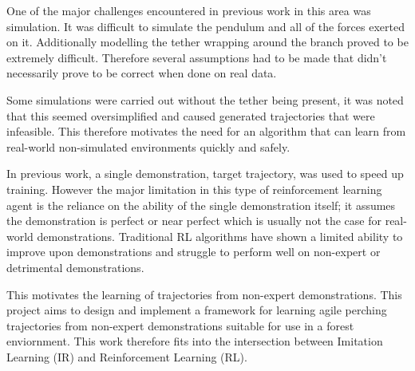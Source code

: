 One of the major challenges encountered in previous work in this area was simulation.
It was difficult to simulate the pendulum and all of the forces exerted on it.
Additionally modelling the tether wrapping around the branch proved to be extremely difficult.
Therefore several assumptions had to be made that didn't necessarily prove to be correct when done on real data.

Some simulations were carried out without the tether being present, it was noted that this seemed oversimplified and caused generated trajectories that were infeasible.
This therefore motivates the need for an algorithm that can learn from real-world non-simulated environments quickly and safely.

In previous work, a single demonstration, target trajectory, was used to speed up training.
However the major limitation in this type of reinforcement learning agent is the reliance on the ability of the single demonstration itself; it assumes the demonstration is perfect or near perfect which is usually not the case for real-world demonstrations.
Traditional RL algorithms have shown a limited ability to improve upon demonstrations and struggle to perform well on non-expert or detrimental demonstrations.

This motivates the learning of trajectories from non-expert demonstrations.
This project aims to design and implement a framework for learning agile perching trajectories from non-expert demonstrations suitable for use in a forest enviornment.
This work therefore fits into the intersection between Imitation Learning (IR) and Reinforcement Learning (RL).